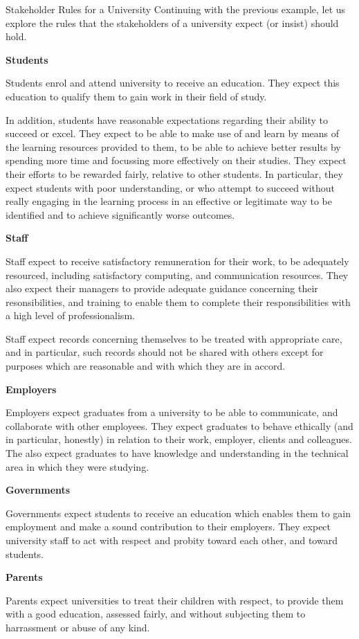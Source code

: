 \begin{example}{Stakeholder Rules for a University}%
Continuing with the previous example, let us explore the rules that the stakeholders of a university
expect (or insist) should hold.

{\bf Students}

Students enrol and attend university to receive an education. They expect this education to qualify
them to gain work in their field of study. 

In addition, students have reasonable expectations regarding their ability to succeed or excel.
They expect to be able to make use of and learn by means of the learning resources provided to
them, to be able to achieve better results by spending more time and focussing more effectively
on their studies. They expect their efforts to be rewarded fairly, relative to other students.
In particular, they expect students with poor understanding, or who attempt to succeed without
really engaging in the learning process in an effective or legitimate way to be identified and
to achieve significantly worse outcomes.



{\bf Staff}

Staff expect to receive satisfactory remuneration for their work, to be adequately resourced,
including satisfactory computing, and communication resources. They also expect their managers
to provide adequate guidance concerning their resonsibilities, and training to enable them
to complete their responsibilities with a high level of professionalism.


Staff expect records concerning themselves to be treated with appropriate care, and in particular,
such records should not be shared with others except for purposes which are reasonable and 
with which they are in accord.

{\bf Employers}

Employers expect graduates from a university to be able to communicate, and collaborate with
other employees. They expect graduates to behave ethically (and in particular, honestly) in relation
to their work, employer, clients and colleagues. The also expect graduates to have knowledge
and understanding in the technical area in which they were studying.

{\bf Governments}

Governments expect students to receive an education which enables them to gain employment and
make a sound contribution to their employers. They expect university staff to act with respect and
probity toward each other, and toward students.

{\bf Parents}

Parents expect universities to treat their children with respect, to provide them with 
a good education, assessed fairly, and without subjecting them to harrassment or
abuse of any kind.

\end{example}

